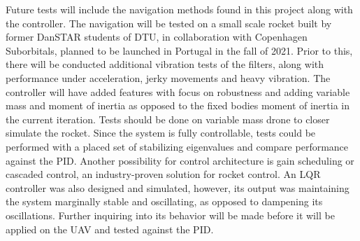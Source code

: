 Future tests will include the navigation methods found in this project along with the controller.  
The navigation will be tested on a small scale rocket built by former DanSTAR students of DTU, in collaboration with Copenhagen Suborbitals, planned to be launched in Portugal in the fall of 2021. Prior to this, there will be conducted additional vibration tests of the filters, along with performance under acceleration, jerky movements and heavy vibration. 
The controller will have added features with focus on robustness and adding variable mass and moment of inertia as opposed to the fixed bodies moment of inertia in the current iteration. Tests should be done on variable mass drone to closer simulate the rocket. Since the system is fully controllable, tests could be performed with a placed set of stabilizing eigenvalues and compare performance against the PID.  
Another possibility for control architecture is gain scheduling or cascaded control, an industry-proven solution for rocket control. 
An LQR controller was also designed and simulated, however, its output was maintaining the system marginally stable and oscillating, as opposed to dampening its oscillations. Further inquiring into its behavior will be made before it will be applied on the UAV and tested against the PID.
